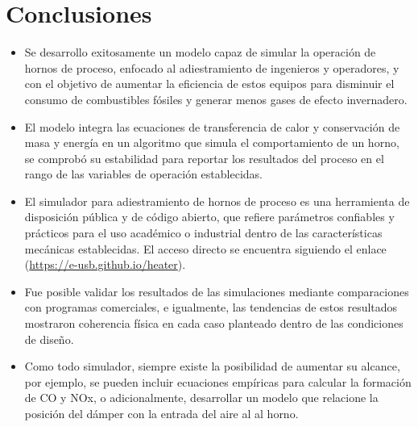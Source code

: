 \chapter*{Conclusiones}

\begin{itemize}
    \item Se desarrollo exitosamente un modelo capaz de simular la operación de hornos de proceso, enfocado al adiestramiento de ingenieros y operadores, y con el objetivo de aumentar la eficiencia de estos equipos para disminuir el consumo de combustibles fósiles y generar menos gases de efecto invernadero.

    \item El modelo integra las ecuaciones de transferencia de calor y conservación de masa y energía en un algoritmo que simula el comportamiento de un horno, se comprobó su estabilidad para reportar los resultados del proceso en el rango de las variables de operación establecidas.
    
    \item El simulador para adiestramiento de hornos de proceso es una herramienta de disposición pública y de código abierto, que refiere parámetros confiables y prácticos para el uso académico o industrial dentro de las características mecánicas establecidas. El acceso directo se encuentra siguiendo el enlace (\url{https://e-usb.github.io/heater}).
    
    \item Fue posible validar los resultados de las simulaciones mediante comparaciones con programas comerciales, e igualmente, las tendencias de estos resultados mostraron coherencia física en cada caso planteado dentro de las condiciones de diseño.
    
    \item Como todo simulador, siempre existe la posibilidad de aumentar su alcance, por ejemplo, se pueden incluir ecuaciones empíricas para calcular la formación de CO y NOx, o adicionalmente, desarrollar un modelo que relacione la posición del dámper con la entrada del aire al al horno.
\end{itemize}